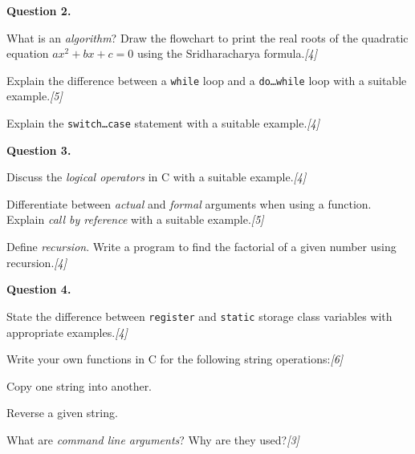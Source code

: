 \documentclass[11pt,a4paper]{article}
\newcommand{\pts}[1]{\hfill   \textit{[#1]}}
\begin{document}
\bigskip




\noindent   \textbf{Question 2.}

\begin{parts}
  \item What is an \emph{algorithm}? Draw the flowchart to print the real roots of the quadratic equation $ax^{2}+bx+c=0$ using the Sridharacharya formula.\pts{4}
  \item Explain the difference between a   \texttt{while} loop and a   \texttt{do\ldots while} loop with a suitable example.\pts{5}
  \item Explain the   \texttt{switch\ldots case} statement with a suitable example.\pts{4}
\end{parts}

\bigskip




\noindent   \textbf{Question 3.}

\begin{parts}
  \item Discuss the \emph{logical operators} in C with a suitable example.\pts{4}
  \item Differentiate between \emph{actual} and \emph{formal} arguments when using a function. Explain \emph{call by reference} with a suitable example.\pts{5}
  \item Define \emph{recursion}. Write a program to find the factorial of a given number using recursion.\pts{4}
\end{parts}

\bigskip




\noindent   \textbf{Question 4.}

\begin{parts}
  \item State the difference between   \texttt{register} and   \texttt{static} storage class variables with appropriate examples.\pts{4}
  \item Write your own functions in C for the following string operations:\pts{6}
    
\begin{parts}
      \item Copy one string into another.
      \item Reverse a given string.
    \end{parts}
  \item What are \emph{command line arguments}? Why are they used?\pts{3}
\end{parts}
\end{document}
